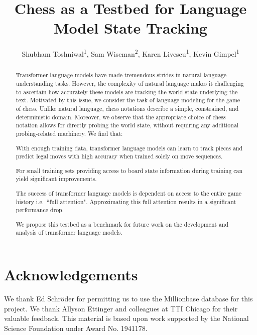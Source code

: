 \documentclass[letterpaper]{article} %
\title{Chess as a Testbed for Language Model State Tracking}
\author{
Shubham Toshniwal\textsuperscript{\rm 1},
Sam Wiseman\textsuperscript{\rm 2},
Karen Livescu\textsuperscript{\rm 1},
Kevin Gimpel\textsuperscript{\rm 1}	
}
\begin{document}
\maketitle

\begin{abstract}
Transformer language models have made tremendous strides in natural language understanding tasks. 
However, the complexity of natural language makes it challenging
to ascertain how accurately these models are tracking the world state underlying the text.
Motivated by this issue, we consider the task of language modeling for the game of chess.
Unlike natural language, chess notations describe a simple, constrained, and deterministic domain.
Moreover, we observe that the appropriate choice of chess notation allows for directly probing the world state, without requiring any additional probing-related machinery.
We find that: 
\begin{enumerate*}[label=(\alph*)]
	\item With enough training data, transformer language models can learn to track pieces and predict legal moves with high accuracy when trained solely on move sequences.
	\item %
	For small training sets %
	providing access to board state information during training can yield significant improvements. 
	\item The success of transformer language models is dependent on access to the entire game history i.e.\ ``full attention". Approximating this full attention results in a significant performance drop. 
\end{enumerate*}
	We propose this testbed as a benchmark for future work on the development and analysis of transformer language models.
\end{abstract}










\section*{Acknowledgements}

We thank Ed Schr\"{o}der for permitting us to use the Millionbase database for this project.
We thank Allyson Ettinger and colleagues at TTI Chicago for their valuable feedback. 
This material is based upon work supported by the National Science Foundation under
Award No. 1941178. 



\clearpage
\newpage
\appendix

\end{document}
